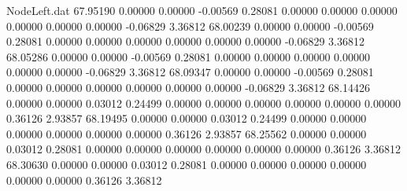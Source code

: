 \begin{filecontents}{NodeLeft.dat}
  67.95190    0.00000    0.00000    -0.00569    0.28081    0.00000    0.00000    0.00000    0.00000    0.00000    0.00000   -0.06829    3.36812
  68.00239    0.00000    0.00000    -0.00569    0.28081    0.00000    0.00000    0.00000    0.00000    0.00000    0.00000   -0.06829    3.36812
  68.05286    0.00000    0.00000    -0.00569    0.28081    0.00000    0.00000    0.00000    0.00000    0.00000    0.00000   -0.06829    3.36812
  68.09347    0.00000    0.00000    -0.00569    0.28081    0.00000    0.00000    0.00000    0.00000    0.00000    0.00000   -0.06829    3.36812
  68.14426    0.00000    0.00000     0.03012    0.24499    0.00000    0.00000    0.00000    0.00000    0.00000    0.00000    0.36126    2.93857
  68.19495    0.00000    0.00000     0.03012    0.24499    0.00000    0.00000    0.00000    0.00000    0.00000    0.00000    0.36126    2.93857
  68.25562    0.00000    0.00000     0.03012    0.28081    0.00000    0.00000    0.00000    0.00000    0.00000    0.00000    0.36126    3.36812
  68.30630    0.00000    0.00000     0.03012    0.28081    0.00000    0.00000    0.00000    0.00000    0.00000    0.00000    0.36126    3.36812
\end{filecontents}
